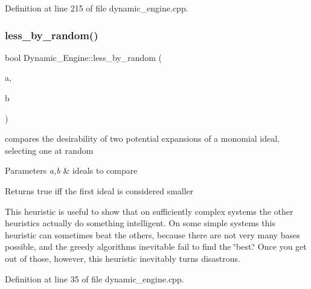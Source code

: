 Definition at line 215 of file dynamic\+\_\+engine.\+cpp.

\mbox{\label{namespace_dynamic___engine_a119c751f93ea0a16eb27f4b08de65bb0}} 
\subsubsection{\texorpdfstring{less\+\_\+by\+\_\+random()}{less\_by\_random()}}
{\footnotesize\ttfamily bool Dynamic\+\_\+\+Engine\+::less\+\_\+by\+\_\+random (\begin{DoxyParamCaption}\item[{const \hyperlink{group___g_b_computation_class_dynamic___engine_1_1_p_p___with___ideal}{P\+P\+\_\+\+With\+\_\+\+Ideal} \&}]{a,  }\item[{const \hyperlink{group___g_b_computation_class_dynamic___engine_1_1_p_p___with___ideal}{P\+P\+\_\+\+With\+\_\+\+Ideal} \&}]{b }\end{DoxyParamCaption})}



compares the desirability of two potential expansions of a monomial ideal, selecting one at random 


\begin{DoxyParams}{Parameters}
{\em a,b} & ideals to compare \\
\hline
\end{DoxyParams}
\begin{DoxyReturn}{Returns}
{\ttfamily true} iff the first ideal is considered smaller
\end{DoxyReturn}
This heuristic is useful to show that on sufficiently complex systems the other heuristics actually do something intelligent. On some simple systems this heuristic can sometimes beat the others, because there are not very many bases possible, and the greedy algorithms inevitable fail to find the \char`\"{}best.\char`\"{} Once you get out of those, however, this heuristic inevitably turns disastrous. 

Definition at line 35 of file dynamic\+\_\+engine.\+cpp.

\mbox{\label{namespace_dynamic___engine_aa27b3fbb646d1d0f5d35de5a69e1cb29}} 
